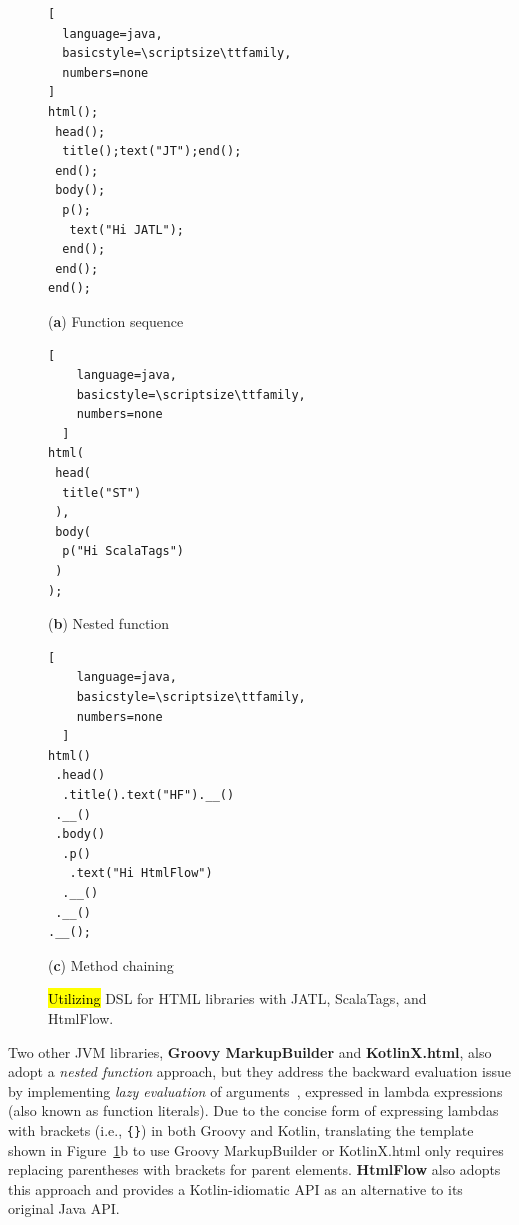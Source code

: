 \documentclass[software,article,accept,pdftex,moreauthors]{Definitions/mdpi}
\begin{document}
\begin{figure}[H]
  \centering

\begin{minipage}[c]{0.33\linewidth}
  \centering
  \begin{lstlisting}[
  language=java,
  basicstyle=\scriptsize\ttfamily,
  numbers=none
]
html();
 head();
  title();text("JT");end();
 end();
 body();
  p();
   text("Hi JATL");
  end();
 end();
end();
  \end{lstlisting}
    \caption*{\centering(\textbf{a}) Function sequence}
  \end{minipage}
  \hfil
  \begin{minipage}[c]{0.23\linewidth}
    \centering
    \begin{lstlisting}[
    language=java,
    basicstyle=\scriptsize\ttfamily,
    numbers=none
  ]
html(
 head(
  title("ST")
 ),
 body(
  p("Hi ScalaTags")
 )
);
  \end{lstlisting}
    \caption*{\centering(\textbf{b}) Nested function}
  \end{minipage}
  \hfil
  \begin{minipage}[c]{0.32\linewidth}
    \centering
    \begin{lstlisting}[
    language=java,
    basicstyle=\scriptsize\ttfamily,
    numbers=none
  ]
html()
 .head()
  .title().text("HF").__()
 .__()
 .body()
  .p()
   .text("Hi HtmlFlow")
  .__()
 .__()
.__();
  \end{lstlisting}
    \caption*{\centering(\textbf{c}) Method chaining}
  \end{minipage}
\vspace*{6pt}
  \caption{\hl{Utilizing} %
 DSL for HTML libraries with JATL, ScalaTags, and HtmlFlow.}
  \label{fig:dsl-idioms}
\end{figure}



Two other JVM libraries, \textbf{Groovy MarkupBuilder} and
\textbf{KotlinX.html}, also adopt a \textit{nested function} approach, but they
address the backward evaluation issue by implementing \textit{lazy evaluation}
of arguments~\cite{Landin65}, expressed in lambda expressions (also known as
function literals). Due to the concise form of expressing lambdas with brackets
(i.e., \texttt{\{\}}) in both Groovy and Kotlin, translating the template shown
in Figure~\ref{fig:dsl-idioms}b to use Groovy MarkupBuilder or KotlinX.html
only requires replacing parentheses with brackets for parent elements.
\textbf{HtmlFlow} also adopts this approach and provides a Kotlin-idiomatic API
as an alternative to its original Java API.
\end{document}
